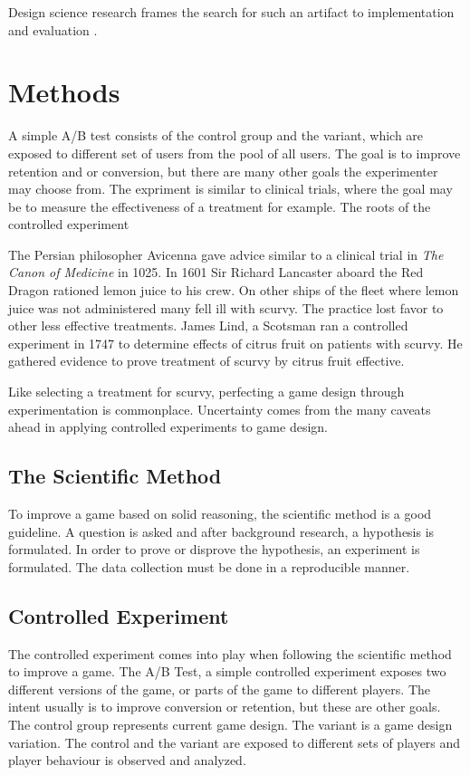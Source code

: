\documentclass[english,12pt,a4paper,pdftex,elec,utf8]{aaltothesis}
\begin{document}
Design science research frames the search for such an artifact to implementation and evaluation \cite{Hevner2004}.

\clearpage

\section{Methods}
A simple A/B test consists of the control group and the variant, which are exposed to different set of users from the pool of all users. The goal is to improve retention and or conversion, but there are many other goals the experimenter may choose from. The expriment is similar to clinical trials, where the goal may be to measure the effectiveness of a treatment for example. The roots of the controlled experiment

The Persian philosopher Avicenna gave advice similar to a clinical trial in \textit{The Canon of Medicine} in 1025. In 1601 Sir Richard Lancaster aboard the Red Dragon rationed lemon juice to his crew. On other ships of the fleet where lemon juice was not administered many fell ill with scurvy. The practice lost favor to other less effective treatments. James Lind, a Scotsman ran a controlled experiment in 1747 to determine effects of citrus fruit on patients with scurvy. He gathered evidence to prove treatment of scurvy by citrus fruit effective.\cite{Mellick2009}

Like selecting a treatment for scurvy, perfecting a game design through experimentation is commonplace. Uncertainty comes from the many caveats ahead in applying controlled experiments to game design.

\subsection{The Scientific Method}
To improve a game based on solid reasoning, the scientific method is a good guideline. A question is asked and after background research, a hypothesis is formulated. In order to prove or disprove the hypothesis, an experiment is formulated. The data collection must be done in a reproducible manner.

\subsection{Controlled Experiment}
The controlled experiment comes into play when following the scientific method to improve a game. The A/B Test, a simple controlled experiment exposes two different versions of the game, or parts of the game to different players. The intent usually is to improve conversion or retention, but these are other goals. The control group represents current game design. The variant is a game design variation. The control and the variant are exposed to different sets of players and player behaviour is observed and analyzed.
\end{document}
